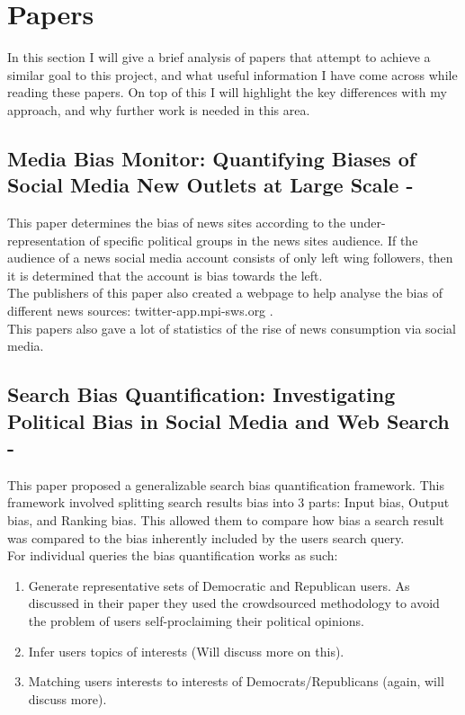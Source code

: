 \documentclass[a4paper,fleqn,10pt]{article}
\begin{document}
\section{Papers}
\label{sec:papers}

In this section I will give a brief analysis of papers that attempt to achieve a similar goal to this project, and what useful
information I have come across while reading these papers.
On top of this I will highlight the key differences with my approach, and why further work is needed in this area.

\subsection{Media Bias Monitor: Quantifying Biases of Social Media New Outlets at Large Scale - \cite{mediabiasmonitor}}
This paper determines the bias of news sites according to the under-representation of specific political groups in the news sites audience.
If the audience of a news social media account consists of only left wing followers, then it is determined that the account is bias towards the left.\\
The publishers of this paper also created a webpage to help analyse the bias of different news sources: twitter-app.mpi-sws.org .
\\
This papers also gave a lot of statistics of the rise of news consumption via social media.

\subsection{Search Bias Quantification: Investigating Political Bias in Social Media and Web Search - \cite{searchbiasquant}}
This paper proposed a generalizable search bias quantification framework. This framework involved splitting search results
bias into 3 parts: Input bias, Output bias, and Ranking bias. This allowed them to compare how bias a search result was compared
to the bias inherently included by the users search query.\\

For individual queries the bias quantification works as such:\\
\begin{enumerate}
    \item Generate representative sets of Democratic and Republican users. As discussed in their paper they used the crowdsourced methodology to avoid the problem of users self-proclaiming their political opinions.
    \item Infer users topics of interests (Will discuss more on this).
    \item Matching users interests to interests of Democrats/Republicans (again, will discuss more).
\end{enumerate}
\end{document}
